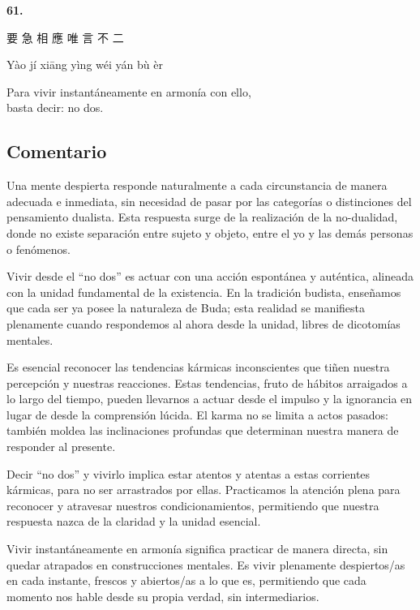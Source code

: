 \documentclass[
  a5paperpaper,
]{article}
\begin{document}
\begin{verseblock}

\newpage

\begin{center}\textbf{61.}\end{center}

要 急 相 應 唯 言 不 二

Yào jí xiāng yìng wéi yán bù èr

Para vivir instantáneamente en armonía con ello,\\
basta decir: no dos.

\end{verseblock}

\hfill\break

\hypertarget{comentario-60}{%
\subsection{Comentario}\label{comentario-60}}

Una mente despierta responde naturalmente a cada circunstancia de manera
adecuada e inmediata, sin necesidad de pasar por las categorías o
distinciones del pensamiento dualista. Esta respuesta surge de la
realización de la no-dualidad, donde no existe separación entre sujeto y
objeto, entre el yo y las demás personas o fenómenos.

Vivir desde el ``no dos'' es actuar con una acción espontánea y
auténtica, alineada con la unidad fundamental de la existencia. En la
tradición budista, enseñamos que cada ser ya posee la naturaleza de
Buda; esta realidad se manifiesta plenamente cuando respondemos al ahora
desde la unidad, libres de dicotomías mentales.

Es esencial reconocer las tendencias kármicas inconscientes que tiñen
nuestra percepción y nuestras reacciones. Estas tendencias, fruto de
hábitos arraigados a lo largo del tiempo, pueden llevarnos a actuar
desde el impulso y la ignorancia en lugar de desde la comprensión
lúcida. El karma no se limita a actos pasados: también moldea las
inclinaciones profundas que determinan nuestra manera de responder al
presente.

Decir ``no dos'' y vivirlo implica estar atentos y atentas a estas
corrientes kármicas, para no ser arrastrados por ellas. Practicamos la
atención plena para reconocer y atravesar nuestros condicionamientos,
permitiendo que nuestra respuesta nazca de la claridad y la unidad
esencial.

Vivir instantáneamente en armonía significa practicar de manera directa,
sin quedar atrapados en construcciones mentales. Es vivir plenamente
despiertos/as en cada instante, frescos y abiertos/as a lo que es,
permitiendo que cada momento nos hable desde su propia verdad, sin
intermediarios.
\end{document}
